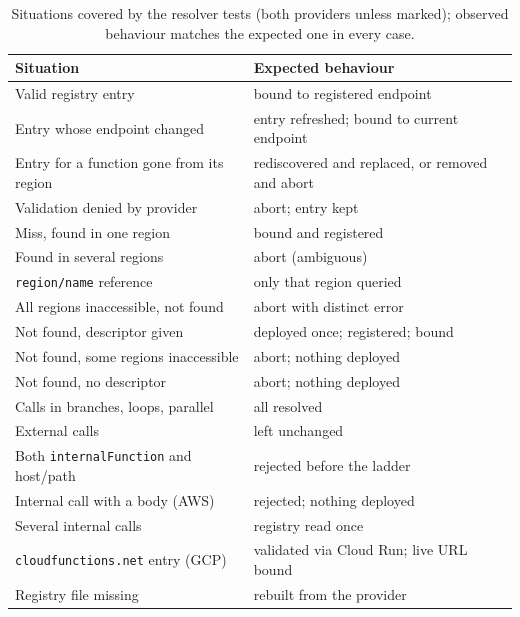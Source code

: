 \documentclass[conference]{IEEEtran}
\begin{document}
\begin{table}[t]
  \centering
  \caption{Situations covered by the resolver tests (both providers unless marked); observed
  behaviour matches the expected one in every case.}
  \label{tab:correct}
  \footnotesize
  \setlength{\tabcolsep}{3pt}
  \begin{tabular}{|p{}|p{}|}
    \hline
    \textbf{Situation} & \textbf{Expected behaviour} \\
    \hline
    Valid registry entry & bound to registered endpoint \\
    \hline
    Entry whose endpoint changed & entry refreshed; bound to current endpoint \\
    \hline
    Entry for a function gone from its region & rediscovered and replaced, or removed and abort \\
    \hline
    Validation denied by provider & abort; entry kept \\
    \hline
    Miss, found in one region & bound and registered \\
    \hline
    Found in several regions & abort (ambiguous) \\
    \hline
    \texttt{region/name} reference & only that region queried \\
    \hline
    All regions inaccessible, not found & abort with distinct error \\
    \hline
    Not found, descriptor given & deployed once; registered; bound \\
    \hline
    Not found, some regions inaccessible & abort; nothing deployed \\
    \hline
    Not found, no descriptor & abort; nothing deployed \\
    \hline
    Calls in branches, loops, parallel & all resolved \\
    \hline
    External calls & left unchanged \\
    \hline
    Both \texttt{internalFunction} and host/path & rejected before the ladder \\
    \hline
    Internal call with a body (AWS) & rejected; nothing deployed \\
    \hline
    Several internal calls & registry read once \\
    \hline
    \texttt{cloudfunctions.net} entry (GCP) & validated via Cloud Run; live URL bound \\
    \hline
    Registry file missing & rebuilt from the provider \\
    \hline
  \end{tabular}
\end{table}
\end{document}
